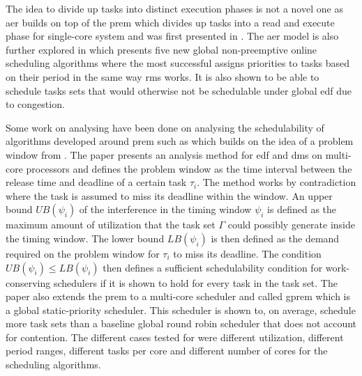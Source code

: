 \documentclass{kththesis}
\begin{document}
The idea to divide up tasks into distinct execution phases is not a novel one as \acrshort{aer}
builds on top of the \acrshort{prem} which divides up tasks into a read and execute phase for
single-core system and was first presented in \parencite{pellizzoni_predictable_2011}. The
\acrshort{aer} model is also further explored in \parencite{maia_closer_2016} which presents five
new global non-preemptive online scheduling algorithms where the most successful assigns priorities
to tasks based on their period in the same way \acrshort{rms} works. It is also shown to be able to
schedule tasks sets that would otherwise not be schedulable under global \acrshort{edf} due to
congestion.

Some work on analysing have been done on analysing the schedulability of algorithms developed around
\acrshort{prem} such as \parencite{alhammad_schedulability_2014} which builds on the idea of a
problem window from \parencite{baker_multiprocessor_2003}. The paper presents an analysis method for
\acrshort{edf} and \acrshort{dms} on multi-core processors and defines the problem window as the
time interval between the release time and deadline of a certain task $ \tau_i $. The method works
by contradiction where the task is assumed to miss its deadline within the window. An upper bound $
UB(\psi_i) $ of the interference in the timing window $ \psi_i $ is defined as the maximum amount of
utilization that the task set $ \Gamma $ could possibly generate inside the timing window. The lower
bound $ LB(\psi_i) $ is then defined as the demand required on the problem window for $ \tau_i $ to
miss its deadline. The condition $ UB(\psi_i) \le LB(\psi_i) $ then defines a sufficient
schedulability condition for work-conserving schedulers if it is shown to hold for every task in the
task set. The paper also extends the \acrshort{prem} to a multi-core scheduler and called
\acrshort{gprem} which is a global static-priority scheduler. This scheduler is shown to, on
average, schedule more task sets than a baseline global round robin scheduler that does not account
for contention. The different cases tested for were different utilization, different period ranges,
different tasks per core and different number of cores for the scheduling algorithms.
\end{document}
